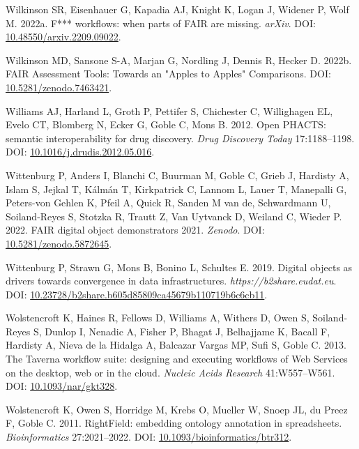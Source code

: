 \begin{CSLReferences}{1}{0}
\leavevmode{}%
Wilkinson SR, Eisenhauer G, Kapadia AJ, Knight K, Logan J, Widener P, Wolf M. 2022a. F*** workflows: when parts of FAIR are missing. \emph{arXiv}. DOI: \href{https://doi.org/10.48550/arxiv.2209.09022}{10.48550/arxiv.2209.09022}.

\leavevmode{}%
Wilkinson MD, Sansone S-A, Marjan G, Nordling J, Dennis R, Hecker D. 2022b. FAIR Assessment Tools: Towards an "Apples to Apples" Comparisons. DOI: \href{https://doi.org/10.5281/zenodo.7463421}{10.5281/zenodo.7463421}.

\leavevmode{}%
Williams AJ, Harland L, Groth P, Pettifer S, Chichester C, Willighagen EL, Evelo CT, Blomberg N, Ecker G, Goble C, Mons B. 2012. Open PHACTS: semantic interoperability for drug discovery. \emph{Drug Discovery Today} 17:1188--1198. DOI: \href{https://doi.org/10.1016/j.drudis.2012.05.016}{10.1016/j.drudis.2012.05.016}.

\leavevmode{}%
Wittenburg P, Anders I, Blanchi C, Buurman M, Goble C, Grieb J, Hardisty A, Islam S, Jejkal T, Kálmán T, Kirkpatrick C, Lannom L, Lauer T, Manepalli G, Peters-von Gehlen K, Pfeil A, Quick R, Sanden M van de, Schwardmann U, Soiland-Reyes S, Stotzka R, Trautt Z, Van Uytvanck D, Weiland C, Wieder P. 2022. FAIR digital object demonstrators 2021. \emph{Zenodo}. DOI: \href{https://doi.org/10.5281/zenodo.5872645}{10.5281/zenodo.5872645}.

\leavevmode{}%
Wittenburg P, Strawn G, Mons B, Bonino L, Schultes E. 2019. Digital objects as drivers towards convergence in data infrastructures. \emph{https://b2share.eudat.eu}. DOI: \href{https://doi.org/10.23728/b2share.b605d85809ca45679b110719b6c6cb11}{10.23728/b2share.b605d85809ca45679b110719b6c6cb11}.

\leavevmode{}%
Wolstencroft K, Haines R, Fellows D, Williams A, Withers D, Owen S, Soiland-Reyes S, Dunlop I, Nenadic A, Fisher P, Bhagat J, Belhajjame K, Bacall F, Hardisty A, Nieva de la Hidalga A, Balcazar Vargas MP, Sufi S, Goble C. 2013. The Taverna workflow suite: designing and executing workflows of Web Services on the desktop, web or in the cloud. \emph{Nucleic Acids Research} 41:W557--W561. DOI: \href{https://doi.org/10.1093/nar/gkt328}{10.1093/nar/gkt328}.

\leavevmode{}%
Wolstencroft K, Owen S, Horridge M, Krebs O, Mueller W, Snoep JL, du Preez F, Goble C. 2011. RightField: embedding ontology annotation in spreadsheets. \emph{Bioinformatics} 27:2021--2022. DOI: \href{https://doi.org/10.1093/bioinformatics/btr312}{10.1093/bioinformatics/btr312}.


\end{CSLReferences}
